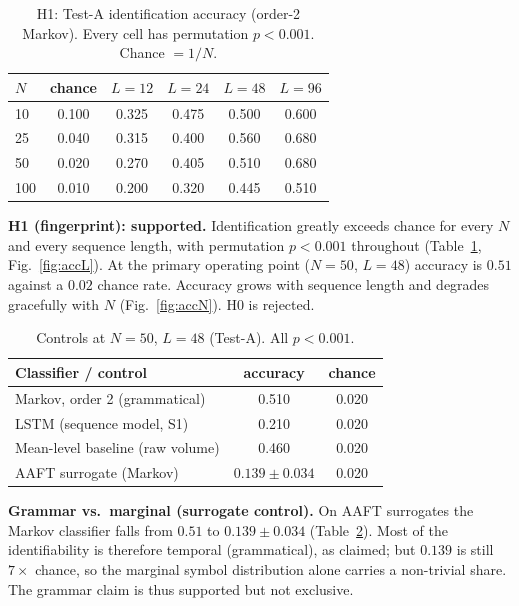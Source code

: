 \documentclass[conference]{IEEEtran}
\begin{document}
\begin{table}[t]
\caption{H1: Test-A identification accuracy (order-2 Markov). Every cell has
permutation $p<0.001$. Chance $=1/N$.}
\label{tab:byn}
\centering\small
\begin{tabular}{lccccc}
\toprule
$N$ & chance & $L{=}12$ & $L{=}24$ & $L{=}48$ & $L{=}96$\\
\midrule
10 & 0.100 & 0.325 & 0.475 & 0.500 & 0.600\\
25 & 0.040 & 0.315 & 0.400 & 0.560 & 0.680\\
50 & 0.020 & 0.270 & 0.405 & 0.510 & 0.680\\
100 & 0.010 & 0.200 & 0.320 & 0.445 & 0.510\\
\bottomrule
\end{tabular}
\end{table}

\textbf{H1 (fingerprint): supported.} Identification greatly exceeds chance for
every $N$ and every sequence length, with permutation $p<0.001$ throughout
(Table~\ref{tab:byn}, Fig.~\ref{fig:accL}). At the primary operating point
($N{=}50$, $L{=}48$) accuracy is $0.51$ against a $0.02$ chance rate. Accuracy
grows with sequence length and degrades gracefully with $N$
(Fig.~\ref{fig:accN}). H0 is rejected.

\begin{table}[t]
\caption{Controls at $N{=}50$, $L{=}48$ (Test-A). All $p<0.001$.}
\label{tab:controls}
\centering\small
\begin{tabular}{lcc}
\toprule
Classifier / control & accuracy & chance\\
\midrule
Markov, order 2 (grammatical) & 0.510 & 0.020\\
LSTM (sequence model, S1) & 0.210 & 0.020\\
Mean-level baseline (raw volume) & 0.460 & 0.020\\
AAFT surrogate (Markov) & $0.139\pm0.034$ & 0.020\\
\bottomrule
\end{tabular}
\end{table}

\textbf{Grammar vs.\ marginal (surrogate control).} On AAFT surrogates the
Markov classifier falls from $0.51$ to $0.139\pm0.034$
(Table~\ref{tab:controls}). Most of the identifiability is therefore temporal
(grammatical), as claimed; but $0.139$ is still $7\times$ chance, so the
marginal symbol distribution alone carries a non-trivial share. The grammar
claim is thus supported but not exclusive.
\end{document}
